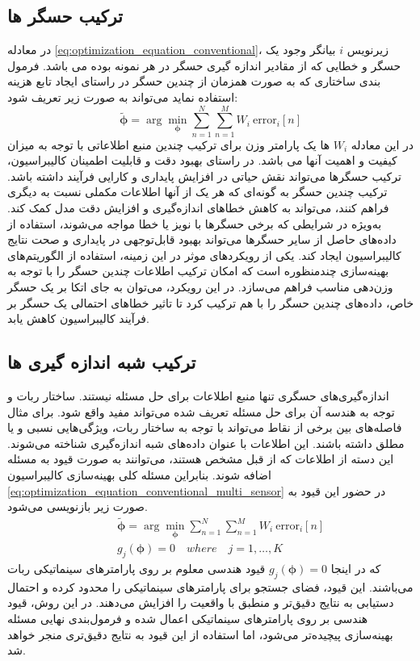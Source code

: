 \subsection{ترکیب حسگر ها}
در معادله 
\ref{eq:optimization_equation_conventional}،
زیرنویس 
$i$
بیانگر وجود یک حسگر و خطایی که از مقادیر اندازه گیری حسگر در هر نمونه بوده می باشد. فرمول بندی ساختاری که به صورت همزمان از چندین حسگر در راستای ایجاد تابع هزینه استفاده نماید می‌تواند به صورت زیر تعریف شود:
\begin{equation}\label{eq:optimization_equation_conventional_multi_sensor}
	\tilde{\boldsymbol{\phi}} =  \arg\min_{\boldsymbol{\phi}} \sum_{n = 1 }^{N} \sum_{n = 1 }^{M} W_i~\text{error}_i[n] 
\end{equation}
در این معادله 
$W_i$
ها یک پارامتر وزن برای ترکیب چندین منبع اطلاعاتی با توجه به میزان کیفیت و اهمیت آنها می باشد. در راستای بهبود دقت و قابلیت اطمینان کالیبراسیون، ترکیب حسگرها می‌تواند نقش حیاتی در افزایش پایداری و کارایی فرآیند داشته باشد. ترکیب چندین حسگر به گونه‌ای که هر یک از آنها اطلاعات مکملی نسبت به دیگری فراهم کنند، می‌تواند به کاهش خطاهای اندازه‌گیری و افزایش دقت مدل کمک کند. به‌ویژه در شرایطی که برخی حسگرها با نویز یا خطا مواجه می‌شوند، استفاده از داده‌های حاصل از سایر حسگرها می‌تواند بهبود قابل‌توجهی در پایداری و صحت نتایج کالیبراسیون ایجاد کند. یکی از رویکردهای موثر در این زمینه، استفاده از الگوریتم‌های بهینه‌سازی چندمنظوره است که امکان ترکیب اطلاعات چندین حسگر را با توجه به وزن‌دهی مناسب فراهم می‌سازد. در این رویکرد، می‌توان به جای اتکا بر یک حسگر خاص، داده‌های چندین حسگر را با هم ترکیب کرد تا تاثیر خطاهای احتمالی یک حسگر بر فرآیند کالیبراسیون کاهش یابد.

\subsection{ترکیب شبه اندازه گیری ها}
اندازه‌گیری‌های حسگری تنها منبع اطلاعات برای حل مسئله نیستند. ساختار ربات و توجه به هندسه آن برای حل مسئله تعریف شده می‌تواند مفید واقع شود. برای مثال فاصله‌های بین برخی از نقاط می‌تواند با توجه به ساختار ربات، ویژگی‌هایی نسبی و یا مطلق داشته باشند. این اطلاعات با عنوان داده‌های شبه اندازه‌گیری شناخته می‌شوند. این دسته از اطلاعات که از قبل مشخص هستند، می‌توانند به صورت قیود به مسئله اضافه شوند. بنابراین مسئله کلی بهینه‌سازی کالیبراسیون
\ref{eq:optimization_equation_conventional_multi_sensor}
در حضور این قیود به صورت زیر باز‌نویسی می‌شود. 
\begin{equation}
	\begin{aligned} \label{eq:optimization_equation_conventional_multi_sensor_measurement}
		&\tilde{\boldsymbol{\phi}} =  \arg\min_{\boldsymbol{\phi}} \sum_{n = 1 }^{N} \sum_{n = 1 }^{M} W_i~\text{error}_i[n] \\
		\quad &g_j(\boldsymbol{\phi}) = 0 \quad where \quad j = 1, \ldots, K
	\end{aligned}
\end{equation}
که در اینجا
$g_j(\boldsymbol{\phi}) = 0$ 
قیود هندسی معلوم بر روی پارامترهای سینماتیکی ربات می‌باشند. این قیود، فضای جستجو برای پارامترهای سینماتیکی را محدود کرده و احتمال دستیابی به نتایج دقیق‌تر و منطبق با واقعیت را افزایش می‌دهند. در این روش، قیود هندسی بر روی پارامترهای سینماتیکی اعمال شده و فرمول‌بندی نهایی مسئله بهینه‌سازی پیچیده‌تر می‌شود، اما استفاده از این قیود به نتایج دقیق‌تری منجر خواهد شد.

